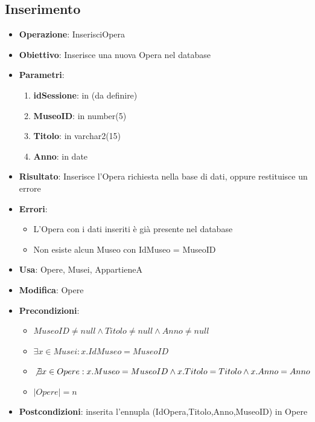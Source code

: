\documentclass[a4paper,11pt]{article}
\begin{document}
\subsection{Inserimento}
\begin{itemize}
	\item \textbf{Operazione}: InserisciOpera
	\item \textbf{Obiettivo}: Inserisce una nuova Opera nel database
	\item \textbf{Parametri}:
	\begin{enumerate}
		\item \textbf{idSessione}: in (da definire)
		\item \textbf{MuseoID}: in number(5)
		\item \textbf{Titolo}: in varchar2(15)
		\item \textbf{Anno}: in date
	\end{enumerate}
	\item \textbf{Risultato}: Inserisce l'Opera richiesta nella base di dati, oppure restituisce un errore
	\item \textbf{Errori}: 
	\begin{itemize}
		\item L'Opera con i dati inseriti è già presente nel database
		\item Non esiste alcun Museo con IdMuseo = MuseoID
	\end{itemize}
	\item \textbf{Usa}: Opere, Musei, AppartieneA
	\item \textbf{Modifica}: Opere
	\item \textbf{Precondizioni}:
	\begin{itemize}
		\item $MuseoID \ne null \land Titolo \ne null \land Anno \ne null$
		\item $\exists x \in Musei : x.IdMuseo = MuseoID$
		\item $\not\exists x \in Opere : x.Museo = MuseoID \land x.Titolo = Titolo \land x.Anno = Anno$
		\item $|Opere| = n$
	\end{itemize}
	\item \textbf{Postcondizioni}: inserita l'ennupla (IdOpera,Titolo,Anno,MuseoID) in Opere
\end{itemize}

\end{document}
